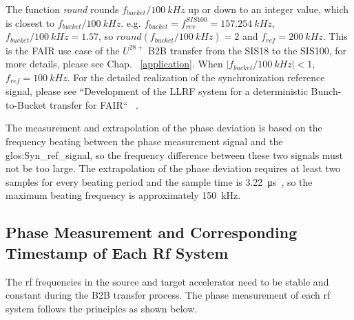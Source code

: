 The function \textit{round} rounds $f_{\mathit{bucket}}/\SI{100}{kHz}$ up or down to an integer value, which is closest to $f_{\mathit{bucket}}/\SI{100}{kHz}$. e.g. $f_{\mathit{bucket}}=f_\mathit{rev}^{SIS100}=\SI{157.254}{kHz}$, $f_{\mathit{bucket}}/\SI{100}{kHz}=1.57$, so $\textit{round} (f_{\mathit{bucket}}/\SI{100}{kHz})=2$ and $f_\mathit{ref}=\SI{200}{kHz}$. This is the FAIR use case of the $U^{28+}$ B2B transfer from the SIS18 to the SIS100, for more details, please see Chap. ~\ref{application}. When $|f_{\mathit{bucket}}/\SI{100}{kHz}|<1$, $f_\mathit{ref}=\SI{100}{kHz}$.  For the detailed realization of the synchronization reference signal, please see ``Development of the LLRF system for a deterministic Bunch-to-Bucket transfer for FAIR`` ~\cite{ferrand_development_nodate}.

The measurement and extrapolation of the phase deviation is based on the frequency beating between the phase measurement signal and the \gls{glos:Syn_ref_signal}, so the frequency difference between these two signals must not be too large. The extrapolation of the phase deviation requires at least two samples for every beating period and the sample time is \SI{3.22}{\us}~\cite{ferrand_development_nodate}, so the maximum beating frequency is approximately \SI{150}{kHz}. 

 
%
\subsection{Phase Measurement and Corresponding Timestamp of Each Rf System}
The rf frequencies in the source and target accelerator need to be stable and constant during the B2B transfer process. The phase measurement of each rf system follows the principles as shown below.

